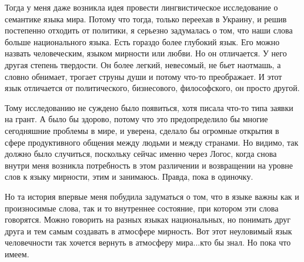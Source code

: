 Тогда у меня даже возникла идея провести лингвистическое исследование о
семантике языка мира. Потому что тогда, только переехав в Украину, и решив
постепенно отходить от политики, я серьезно задумалась о том, что наши слова
больше национального языка. Есть гораздо более глубокий язык. Его можно назвать
человеческим, языком мирности или любви. Но он отличается. У него другая
степень твердости. Он более легкий, невесомый, не бьет наотмашь, а словно
обнимает, трогает струны души и потому что-то преображает. И этот язык
отличается от политического, бизнесового, философского, он просто другой. 

Тому исследованию не суждено было появиться, хотя писала что-то типа заявки на
грант. А было бы здорово, потому что это предопределило бы многие сегодняшние
проблемы в мире, и уверена, сделало бы огромные открытия в сфере продуктивного
общения между людьми и между странами. Но видимо, так должно было случиться,
поскольку сейчас именно через Логос, когда снова внутри меня возникла
потребность в этом различении и возвращении на уровне слов к языку мирности,
этим и занимаюсь. Правда, пока в одиночку. 

Но та история впервые меня побудила задуматься о том, что в языке важны как и
произносимые слова, так и то внутреннее состояние, при котором эти слова
говорятся. Можно говорить на разных языках национальных, но понимать друг друга
и тем самым создавать в атмосфере мирность. Вот этот неуловимый язык
человечности так хочется вернуть в атмосферу мира...кто бы знал. Но пока что
имеем. 
